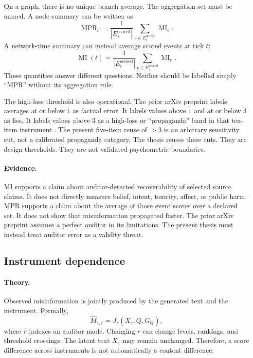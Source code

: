 On a graph, there is no unique branch average.
The aggregation set must be named.
A node summary can be written as
\begin{equation}
\operatorname{MPR}_i
=
\frac{1}{|E_i^{\mathrm{scored}}|}
\sum_{e\in E_i^{\mathrm{scored}}}
\operatorname{MI}_e.
\label{eq:node-mpr}
\end{equation}
A network-time summary can instead average scored events at tick \(t\):
\begin{equation}
\overline{\operatorname{MI}}(t)
=
\frac{1}{|E_t^{\mathrm{scored}}|}
\sum_{e\in E_t^{\mathrm{scored}}}
\operatorname{MI}_e.
\label{eq:network-mi}
\end{equation}
These quantities answer different questions.
Neither should be labelled simply ``MPR'' without its aggregation rule.

The high-loss threshold is also operational.
The prior arXiv preprint labels averages at or below \(1\) as factual error.
It labels values above \(1\) and at or below \(3\) as lies.
It labels values above \(3\) as a high-loss or ``propaganda'' band in that
ten-item instrument \parencite{maurya2025simulating}. The present five-item
reuse of \(>3\) is an arbitrary sensitivity cut, not a calibrated propaganda
category.
The thesis reuses these cuts.
They are design thresholds.
They are not validated psychometric boundaries.

\paragraph{Evidence.}
MI supports a claim about auditor-detected recoverability of selected source claims.
It does not directly measure belief, intent, toxicity, affect, or public harm.
MPR supports a claim about the average of those event scores over a declared set.
It does not show that misinformation propagated faster.
The prior arXiv preprint assumes a perfect auditor in its limitations.
The present thesis must instead treat auditor error as a validity threat.

\subsection{Instrument dependence}
\label{subsec:instrument-dependence}

\paragraph{Theory.}
Observed misinformation is jointly produced by the generated text and the instrument.
Formally,
\begin{equation}
\widehat{M}_{e,r}
=
J_r(X_e,Q,G_Q),
\label{eq:instrument-index}
\end{equation}
where \(r\) indexes an auditor mode.
Changing \(r\) can change levels, rankings, and threshold crossings.
The latent text \(X_e\) may remain unchanged.
Therefore, a score difference across instruments is not automatically a content difference.

